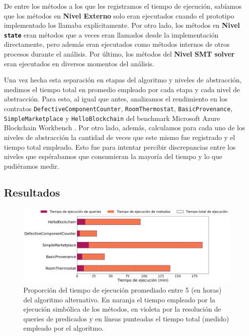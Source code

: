 De  entre los métodos a los que les registramos el tiempo de ejecución, sabíamos que los métodos en \textbf{Nivel Externo} solo eran ejecutados cuando el prototipo implementado los llamaba explícitamente.
Por otro lado, los métodos en \textbf{Nivel \texttt{state}} eran métodos que a veces eran llamados desde la implementación directamente, pero además eran ejecutados como métodos internos de otros procesos durante el análisis.
Por último, los métodos del \textbf{Nivel SMT solver} eran ejecutados en diversos momentos del análisis.

Una vez hecha esta separación en etapas del algoritmo y niveles de abstracción, medimos el tiempo total en promedio empleado por cada etapa y cada nivel de abstracción.
Para esto, al igual que antes, analizamos el rendimiento en los contratos \texttt{DefectiveComponent\allowbreak Counter}, \texttt{RoomThermostat}, \texttt{BasicProvenance}, \texttt{SimpleMarketplace} y \texttt{HelloBlockchain} del benchmark Microsoft Azure Blockchain Workbench \cite{azure-benchmark}.
Por otro lado, además, calculamos para cada uno de los niveles de abstracción la cantidad de veces que este mismo fue registrado y el tiempo total empleado.
Esto fue para intentar percibir discrepancias entre los niveles que espérabamos que consumieran la mayoría del tiempo y lo que pudiéramos medir.

\subsection{Resultados}

\begin{figure}
    \includegraphics[width=\textwidth]{figs/categories-bar-graph.png}
    \caption{Proporción del tiempo de ejecución promediado entre 5 (en horas) del algoritmo alternativo.
        En naranja el tiempo empleado por la ejecución simbólica de los métodos, en violeta por la resolución de queries de predicados y en líneas punteadas el tiempo total (medido) empleado por el algoritmo.}
    \label{fig:tiempo-categorias}
\end{figure}

